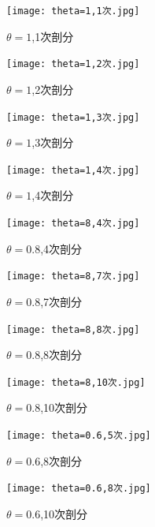 \documentclass[12pt]{ctexart}
\begin{document}
\begin{figure}[H]
	\centering
	\begin{minipage}[t]{0.48\textwidth}
		\centering
		\texttt{[image: theta=1,1次.jpg]}
		\caption{$\theta=1$,1次剖分}
	\end{minipage}
	\begin{minipage}[t]{0.48\textwidth}
		\centering
		\texttt{[image: theta=1,2次.jpg]}
		\caption{$\theta=1$,2次剖分}
	\end{minipage}
\end{figure}
\begin{figure}[H]
	\centering
	\begin{minipage}[t]{0.48\textwidth}
		\centering
		\texttt{[image: theta=1,3次.jpg]}
		\caption{$\theta=1$,3次剖分}
	\end{minipage}
	\begin{minipage}[t]{0.48\textwidth}
		\centering
		\texttt{[image: theta=1,4次.jpg]}
		\caption{$\theta=1$,4次剖分}
	\end{minipage}
\end{figure}
\begin{figure}[H]
	\centering
	\begin{minipage}[t]{0.48\textwidth}
		\centering
		\texttt{[image: theta=8,4次.jpg]}
		\caption{$\theta=0.8$,4次剖分}
	\end{minipage}
	\begin{minipage}[t]{0.48\textwidth}
		\centering
		\texttt{[image: theta=8,7次.jpg]}
		\caption{$\theta=0.8$,7次剖分}
	\end{minipage}
\end{figure}
\begin{figure}[H]
	\centering
	\begin{minipage}[t]{0.48\textwidth}
		\centering
		\texttt{[image: theta=8,8次.jpg]}
		\caption{$\theta=0.8$,8次剖分}
	\end{minipage}
	\begin{minipage}[t]{0.48\textwidth}
		\centering
		\texttt{[image: theta=8,10次.jpg]}
		\caption{$\theta=0.8$,10次剖分}
		\end{minipage}
	\end{figure}
\begin{figure}[H]
	\centering
	\begin{minipage}[t]{0.48\textwidth}
		\centering
		\texttt{[image: theta=0.6,5次.jpg]}
		\caption{$\theta=0.6$,8次剖分}
	\end{minipage}
	\begin{minipage}[t]{0.48\textwidth}
		\centering
		\texttt{[image: theta=0.6,8次.jpg]}
		\caption{$\theta=0.6$,10次剖分}
	\end{minipage}
\end{figure}
\end{document}
